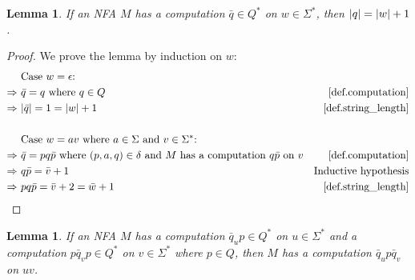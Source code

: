 \documentclass{report}
\DeclarePairedDelimiter{\abs}{\lvert}{\rvert}
\newtheorem{lemma}[theorem]{Lemma}
\theoremstyle{definition}
\begin{document}
\begin{appendices}
\begin{lemma} \label{lma.computation_length}
If an NFA $M$ has a computation $\bar{q} \in Q^{\ast}$ on
$w \in \Sigma^{\ast}$, then $\abs{q} = \abs{w} + 1$.
\end{lemma}

\begin{proof}
We prove the lemma by induction on $w$:
\begin{align*}
& \text{Case } w = \epsilon \text{:} \\
\Rightarrow \ & \bar{q} = q \text{ where } q \in Q
& \text{\cref{def.computation}} \\
\Rightarrow \ & \abs{\bar{q}} = 1 = \abs{w} + 1
& \text{\cref{def.string_length}} \\
\\
& \text{Case } w = av \text{ where } a \in \Sigma \text{ and } v \in \Sigma^{\ast}
\text{:} \\
\Rightarrow \ & \bar{q} = pq \bar{p} \text{ where } (p, a, q) \in \delta
\text{ and } M \text{ has a computation } q \bar{p} \text{ on } v
& \text{\cref{def.computation}} \\
\Rightarrow \ & q \bar{p} = \bar{v} + 1
& \text{Inductive hypothesis} \\
\Rightarrow \ & pq \bar{p} = \bar{v} + 2 = \bar{w} + 1
& \text{\cref{def.string_length}} \\
\end{align*}
\end{proof}

\begin{lemma} \label{lma.computation_join}
If an NFA $M$ has a computation $\bar{q}_u p \in Q^{\ast}$ on
$u \in \Sigma^{\ast}$ and a computation $p \bar{q}_v p \in Q^{\ast}$ on
$v \in \Sigma^{\ast}$ where $p \in Q$, then $M$ has a computation
$\bar{q}_u p \bar{q}_v$ on $uv$.
\end{lemma}


\end{appendices}
\end{document}
